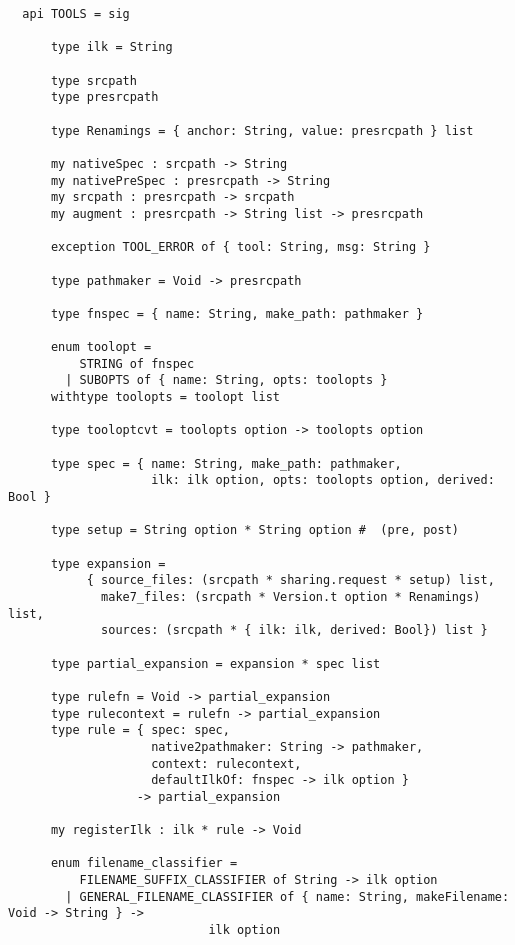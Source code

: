 \begin{small}
\begin{verbatim}
  api TOOLS = sig
  
      type ilk = String
  
      type srcpath
      type presrcpath
  
      type Renamings = { anchor: String, value: presrcpath } list
  
      my nativeSpec : srcpath -> String
      my nativePreSpec : presrcpath -> String
      my srcpath : presrcpath -> srcpath
      my augment : presrcpath -> String list -> presrcpath
  
      exception TOOL_ERROR of { tool: String, msg: String }
  
      type pathmaker = Void -> presrcpath

      type fnspec = { name: String, make_path: pathmaker }  

      enum toolopt =
          STRING of fnspec
        | SUBOPTS of { name: String, opts: toolopts }
      withtype toolopts = toolopt list
  
      type tooloptcvt = toolopts option -> toolopts option
  
      type spec = { name: String, make_path: pathmaker,
                    ilk: ilk option, opts: toolopts option, derived: Bool }
  
      type setup = String option * String option #  (pre, post) 
  
      type expansion =
           { source_files: (srcpath * sharing.request * setup) list,
             make7_files: (srcpath * Version.t option * Renamings) list,
             sources: (srcpath * { ilk: ilk, derived: Bool}) list }
  
      type partial_expansion = expansion * spec list
  
      type rulefn = Void -> partial_expansion
      type rulecontext = rulefn -> partial_expansion
      type rule = { spec: spec,
                    native2pathmaker: String -> pathmaker,
                    context: rulecontext,
                    defaultIlkOf: fnspec -> ilk option }
                  -> partial_expansion
  
      my registerIlk : ilk * rule -> Void
  
      enum filename_classifier =
          FILENAME_SUFFIX_CLASSIFIER of String -> ilk option
        | GENERAL_FILENAME_CLASSIFIER of { name: String, makeFilename: Void -> String } ->
                            ilk option
  

\end{verbatim}
\end{small}
